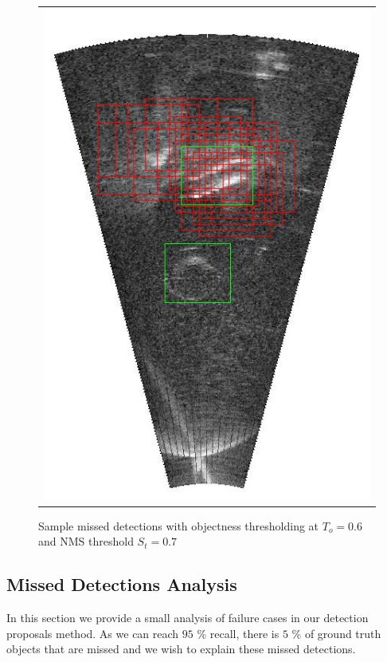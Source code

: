 \begin{figure}[!p]
{\begin{tabular}[b]{c}
		\includegraphics[height=0.2\textheight]{chapters/images/proposals/errors/fcn-2016-02-11_070611-frame03883-proposals.jpg}
        \end{tabular}
	}
	
	\vspace*{-1.0cm}
	\caption{Sample missed detections with objectness thresholding at $T_o = 0.6$ and NMS threshold $S_t = 0.7$}
	\label{proposals:errorSamples}
\end{figure}

\subsection{Missed Detections Analysis}

In this section we provide a small analysis of failure cases in our detection proposals method. As we can reach $95$ \% recall, there is $5$ \% of ground truth objects that are missed and we wish to explain these missed detections.

